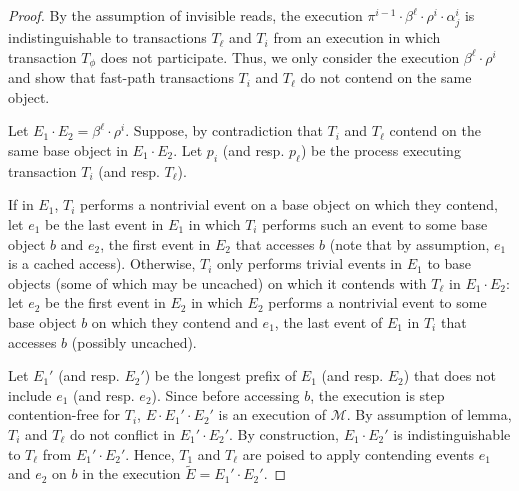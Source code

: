 \begin{proof}
%
By the assumption of invisible reads,
the execution $\pi^{i-1}\cdot \beta^{\ell}\cdot \rho^i \cdot \alpha_j^i$
is indistinguishable to
transactions $T_{\ell}$ and $T_{i}$
from an execution in which transaction $T_{\phi}$ does not participate.
Thus, we only consider the execution $\beta^{\ell}\cdot \rho^i$ and show that fast-path transactions $T_i$ and $T_{\ell}$ do not contend on the same object.                                                                                                                                                                                                    

Let $E_1\cdot E_2=\beta^{\ell}\cdot \rho^i$. 
Suppose, by contradiction that $T_i$ and $T_{\ell}$ 
contend on the same base object in $E_1\cdot E_2$.
Let $p_i$ (and resp. $p_{\ell}$) be the process executing transaction $T_i$ (and resp. $T_{\ell}$).

If in $E_1$, $T_i$ performs a nontrivial event on a base object on which they contend, let $e_1$ be the last
event in $E_1$ in which $T_i$ performs such an event to some base object $b$ and $e_2$, the first event
in $E_2$ that accesses $b$ (note that by assumption, $e_1$ is a cached access).
Otherwise, $T_i$ only performs trivial events in $E_1$ to base objects (some of which may be uncached) on which it contends with $T_{\ell}$ in $E_1\cdot E_2$:
let $e_2$ be the first event in $E_2$ in which $E_2$ performs a nontrivial event to some base object $b$
on which they contend and $e_1$, the last event of $E_1$ in $T_i$ that accesses $b$ (possibly uncached).

Let $E_1'$ (and resp. $E_2'$) be the longest prefix of $E_1$ (and resp. $E_2$) that does not include
$e_1$ (and resp. $e_2$).
Since before accessing $b$, the execution is step contention-free for $T_i$, $E \cdot
E_1'\cdot E_2'$ is an execution of $\mathcal{M}$.
By assumption of lemma, $T_i$ and $T_{\ell}$ do not conflict in $E_1'\cdot E_2'$.
By construction, $E_1 \cdot E_2'$ is indistinguishable to $T_{\ell}$ from $E_1' \cdot E_2'$.
Hence, $T_1$ and $T_{\ell}$ are poised to apply contending events $e_1$ and $e_2$ on $b$ in the execution
$\tilde E=E_1' \cdot E_2'$.


\end{proof}
